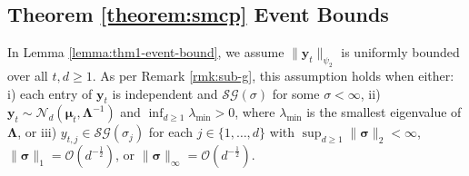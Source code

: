 \subsection{Theorem \ref{theorem:smcp} Event Bounds}
\label{app:thm1-events}

In Lemma \ref{lemma:thm1-event-bound}, we assume $\lVert \mathbf{y}_t\rVert_{\psi_2}$ is uniformly bounded over all $t, d \geq 1$. As per Remark \ref{rmk:sub-g}, this assumption holds when either: i) each entry of $\mathbf{y}_t$ is independent and $\mathcal{SG}(\sigma)$ for some $\sigma < \infty$, ii) $\mathbf{y}_t \sim \mathcal{N}_d(\boldsymbol{\mu}_t, \boldsymbol{\Lambda}^{-1})$ and $\inf_{d\geq 1}  \lambda_{\min} > 0$, where $\lambda_{\min}$ is the smallest eigenvalue of $\boldsymbol{\Lambda}$, or iii) $y_{t,j} \in \mathcal{SG}(\sigma_j)$ for each $j \in \{1,\ldots, d\}$ with $\sup_{d \geq 1} \lVert\boldsymbol{\sigma}\rVert_2 < \infty$, $\lVert\boldsymbol{\sigma}\rVert_1 = \mathcal{O}(d^{-\frac{1}{2}})$, or $\lVert\boldsymbol{\sigma}\rVert_\infty = \mathcal{O}(d^{-\frac{1}{2}})$. 

